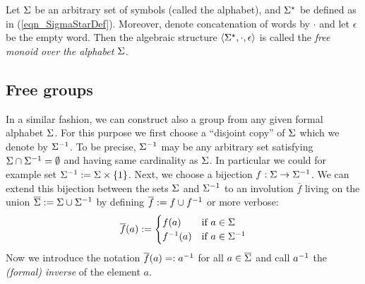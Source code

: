 \begin{definition}
\label{dfn_FreeMonoid}
Let $\Sigma$ be an arbitrary set of symbols (called the alphabet), and ${\Sigma}^{\star}$ be defined as in (\ref{eqn_SigmaStarDef}). Moreover, denote concatenation of words by $\cdot$ and let $\epsilon$ be the empty word. Then the algebraic structure $\langle {\Sigma}^{\star}, \cdot, \epsilon \rangle$ is called the \emph{free monoid over the alphabet $\Sigma$}.
\end{definition} 

\subsection{Free groups}
In a similar fashion, we can construct also a group from any given formal alphabet $\Sigma$. For this purpose we first choose a ``disjoint copy'' of $\Sigma$ which we denote by ${\Sigma}^{-1}$. To be precise, ${\Sigma}^{-1}$ may be any arbitrary set satisfying $\Sigma \cap {\Sigma}^{-1} = \emptyset$ and having same cardinality as $\Sigma$. In particular we could for example set ${\Sigma}^{-1} := \Sigma \times \{1\}$. Next, we choose a bijection $f : \Sigma \to {\Sigma}^{-1}$. We can extend this bijection between the sets $\Sigma$ and ${\Sigma}^{-1}$ to an involution $\overline{f}$ living on the union $\overline{\Sigma} := \Sigma \cup {\Sigma}^{-1}$ by defining $\overline{f} := f \cup {f}^{-1}$ or more verbose:
\begin{equation*}
\overline{f}(a) := \begin{cases}
f(a)       & \text{if } a \in \Sigma\\
{f}^{-1}(a) & \text{if } a \in {\Sigma}^{-1}
\end{cases}
\end{equation*}
Now we introduce the notation $\overline{f}(a) =: {a}^{-1}$ for all $a \in \overline{\Sigma}$ and call ${a}^{-1}$ the \emph{(formal) inverse} of the element $a$. 

